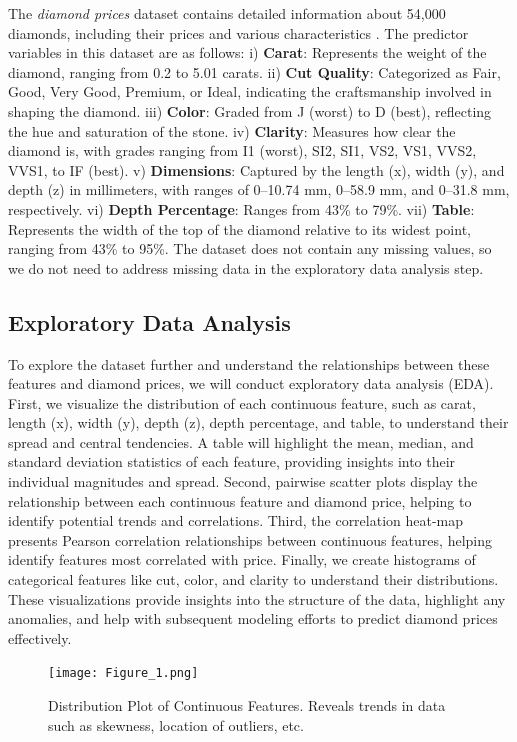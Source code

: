 \documentclass[conference]{IEEEtran}
\begin{document}
The \emph{diamond prices} dataset contains detailed information about 54,000 diamonds, including their prices and various characteristics \cite{a2}. The predictor variables in this dataset are as follows: i) \textbf{Carat}: Represents the weight of the diamond, ranging from 0.2 to 5.01 carats. ii) \textbf{Cut Quality}: Categorized as Fair, Good, Very Good, Premium, or Ideal, indicating the craftsmanship involved in shaping the diamond. iii) \textbf{Color}: Graded from J (worst) to D (best), reflecting the hue and saturation of the stone. iv) \textbf{Clarity}: Measures how clear the diamond is, with grades ranging from I1 (worst), SI2, SI1, VS2, VS1, VVS2, VVS1, to IF (best). v) \textbf{Dimensions}: Captured by the length (x), width (y), and depth (z) in millimeters, with ranges of 0–10.74 mm, 0–58.9 mm, and 0–31.8 mm, respectively. vi) \textbf{Depth Percentage}: Ranges from 43\% to 79\%. vii) \textbf{Table}: Represents the width of the top of the diamond relative to its widest point, ranging from 43\% to 95\%. The dataset does not contain any missing values, so we do not need to address missing data in the exploratory data analysis step.

\subsection{Exploratory Data Analysis}

To explore the dataset further and understand the relationships between these features and diamond prices, we will conduct exploratory data analysis (EDA). First, we visualize the distribution of each continuous feature, such as carat, length (x), width (y), depth (z), depth percentage, and table, to understand their spread and central tendencies. A table will highlight the mean, median, and standard deviation statistics of each feature, providing insights into their individual magnitudes and spread. Second, pairwise scatter plots display the relationship between each continuous feature and diamond price, helping to identify potential trends and correlations. Third, the correlation heat-map presents Pearson correlation relationships between continuous features, helping identify features most correlated with price. Finally, we create histograms of categorical features like cut, color, and clarity to understand their distributions. These visualizations provide insights into the structure of the data, highlight any anomalies, and help with subsequent modeling efforts to predict diamond prices effectively.

\begin{figure}[H]
    \centering
    \texttt{[image: Figure\_1.png]}
    \caption{Distribution Plot of Continuous Features. Reveals trends in data such as skewness, location of outliers, etc.}
    \label{fig:image_label}
\end{figure}
\end{document}
